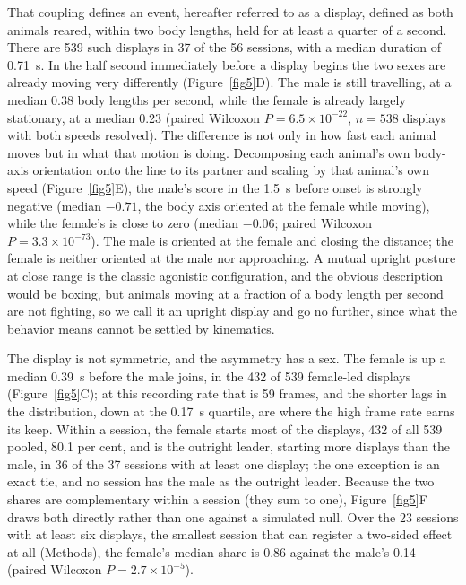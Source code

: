 \documentclass[pdflatex, sn-nature]{sn-jnl}
\theoremstyle{thmstyleone}%
\theoremstyle{thmstyletwo}%
\theoremstyle{thmstylethree}%
\begin{document}
That coupling defines an event, hereafter referred to as a display, defined as both animals reared, within two body lengths, held for at least a quarter of a second. There are 539 such displays in 37 of the 56 sessions, with a median duration of 0.71~s. In the half second immediately before a display begins the two sexes are already moving very differently (Figure~\ref{fig5}D). The male is still travelling, at a median 0.38 body lengths per second, while the female is already largely stationary, at a median 0.23 (paired Wilcoxon $P = 6.5 \times 10^{-22}$, $n = 538$ displays with both speeds resolved). The difference is not only in how fast each animal moves but in what that motion is doing. Decomposing each animal's own body-axis orientation onto the line to its partner and scaling by that animal's own speed (Figure~\ref{fig5}E), the male's score in the 1.5~s before onset is strongly negative (median $-0.71$, the body axis oriented at the female while moving), while the female's is close to zero (median $-0.06$; paired Wilcoxon $P = 3.3 \times 10^{-73}$). The male is oriented at the female and closing the distance; the female is neither oriented at the male nor approaching. A mutual upright posture at close range is the classic agonistic configuration, and the obvious description would be boxing, but animals moving at a fraction of a body length per second are not fighting, so we call it an upright display and go no further, since what the behavior means cannot be settled by kinematics.

The display is not symmetric, and the asymmetry has a sex. The female is up a median 0.39~s before the male joins, in the 432 of 539 female-led displays (Figure~\ref{fig5}C); at this recording rate that is 59 frames, and the shorter lags in the distribution, down at the 0.17~s quartile, are where the high frame rate earns its keep. Within a session, the female starts most of the displays, 432 of all 539 pooled, 80.1 per cent, and is the outright leader, starting more displays than the male, in 36 of the 37 sessions with at least one display; the one exception is an exact tie, and no session has the male as the outright leader. Because the two shares are complementary within a session (they sum to one), Figure~\ref{fig5}F draws both directly rather than one against a simulated null. Over the 23 sessions with at least six displays, the smallest session that can register a two-sided effect at all (Methods), the female's median share is 0.86 against the male's 0.14 (paired Wilcoxon $P = 2.7 \times 10^{-5}$).
\end{document}
